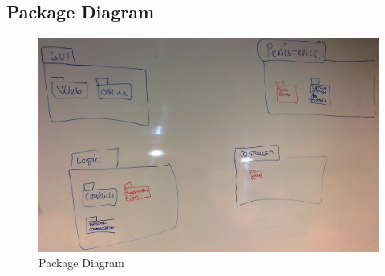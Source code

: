 \subsection{Package Diagram}
\begin{figure}[h!]
  \includegraphics[width=\textwidth,natwidth=2631,natheight=1660]{illustrations/PackageDiagram.jpg}
  \caption{Package Diagram}
  \label{packagediagram}
\end{figure}
